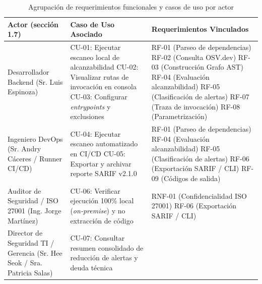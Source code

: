 \begin{table}[H]
\centering
\caption{Agrupación de requerimientos funcionales y casos de uso por actor}
\label{tab:agrupacion_rf_actores}
\small
{}
\begin{tabularx}{\textwidth}{>{\raggedright\arraybackslash}p{3.4cm} >{\raggedright\arraybackslash}p{4.6cm} >{\raggedright\arraybackslash}X}
\toprule
\textbf{Actor (sección 1.7)} & \textbf{Caso de Uso Asociado} & \textbf{Requerimientos Vinculados} \\
\midrule
Desarrollador Backend \newline (Sr. Luis Espinoza) & 
CU-01: Ejecutar escaneo local de alcanzabilidad \newline
CU-02: Visualizar rutas de invocación en consola \newline
CU-03: Configurar \textit{entrypoints} y exclusiones & 
RF-01 (Parseo de dependencias) \newline
RF-02 (Consulta OSV.dev) \newline
RF-03 (Construcción Grafo AST) \newline
RF-04 (Evaluación alcanzabilidad) \newline
RF-05 (Clasificación de alertas) \newline
RF-07 (Traza de invocación) \newline
RF-08 (Parametrización) \\
\addlinespace
Ingeniero DevOps \newline (Sr. Andry Cáceres / Runner CI/CD) & 
CU-04: Ejecutar escaneo automatizado en CI/CD \newline
CU-05: Exportar y archivar reporte SARIF v2.1.0 & 
RF-01 (Parseo de dependencias) \newline
RF-04 (Evaluación alcanzabilidad) \newline
RF-05 (Clasificación de alertas) \newline
RF-06 (Exportación SARIF / CLI) \newline
RF-09 (Códigos de salida) \\
\addlinespace
Auditor de Seguridad / ISO 27001 \newline (Ing. Jorge Martínez) & 
CU-06: Verificar ejecución 100\% local (\textit{on-premise}) y no extracción de código & 
RNF-01 (Confidencialidad ISO 27001) \newline
RF-06 (Exportación SARIF / CLI) \\
\addlinespace
Director de Seguridad TI / Gerencia \newline (Sr. Hee Seok / Sra. Patricia Salas) & 
CU-07: Consultar resumen consolidado de reducción de alertas y deuda técnica & 

\end{tabularx}
\end{table}
